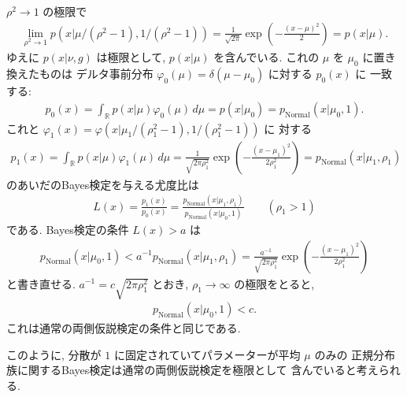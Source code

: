 \documentclass[12pt,twoside]{jarticle}
\newcommand\R{{\mathbb R}} %
\theoremstyle{jplain}
\theoremstyle{jplain}
\theoremstyle{jplain}
\numberwithin{theorem}{section}
\numberwithin{equation}{section}
\numberwithin{figure}{section}
\numberwithin{table}{section}
\begin{document}
$\rho^2\to 1$ の極限で
\begin{align*}
  \lim_{\rho^2\to1}
  p(x|\mu/(\rho^2-1),1/(\rho^2-1))
  =\frac{1}{\sqrt{2\pi}}\exp\left(-\frac{(x-\mu)^2}{2}\right)
  =p(x|\mu).
\end{align*}
ゆえに $p(x|\nu,g)$ は極限として, $p(x|\mu)$ を含んでいる.
これの $\mu$ を $\mu_0$ に置き換えたものは
デルタ事前分布 $\varphi_0(\mu)=\delta(\mu-\mu_0)$ に対する $p_0(x)$ に
一致する:
\begin{align*}
  p_0(x) = \int_\R p(x|\mu)\varphi_0(\mu)\,d\mu = p(x|\mu_0)
  =p_{\mathrm{Normal}}(x|\mu_0,1).
\end{align*}
これと $\varphi_1(x)=\varphi(x|\mu_1/(\rho_1^2-1),1/(\rho_1^2-1))$ に
対する
\begin{align*}
  p_1(x) = \int_\R p(x|\mu)\varphi_1(\mu)\,d\mu
  = \frac{1}{\sqrt{2\pi\rho_1^2}}
  \exp\left(-\frac{(x-\mu_1)^2}{2\rho_1^2}\right)
  =p_{\mathrm{Normal}}(x|\mu_1,\rho_1)
\end{align*}
のあいだのBayes検定を与える尤度比は
\begin{align*}
  L(x)
  =\frac{p_1(x)}{p_0(x)}
  =\frac
  {p_{\mathrm{Normal}}(x|\mu_1,\rho_1)}
  {p_{\mathrm{Normal}}(x|\mu_0,1)}
  \qquad (\rho_1>1)
\end{align*}
である. Bayes検定の条件 $L(x)>a$ は
\begin{align*}
  p_{\mathrm{Normal}}(x|\mu_0,1)
  < a^{-1} p_{\mathrm{Normal}}(x|\mu_1,\rho_1)
  = \frac{a^{-1}}{\sqrt{2\pi\rho_1^2}}
  \exp\left(-\frac{(x-\mu_1)^2}{2\rho_1^2}\right)
\end{align*}
と書き直せる.  $a^{-1} = c\sqrt{2\pi\rho_1^2}$ とおき,
$\rho_1\to\infty$ の極限をとると,
\begin{align*}
  p_{\mathrm{Normal}}(x|\mu_0,1) < c.
\end{align*}
これは通常の両側仮説検定の条件と同じである.

このように, 分散が $1$ に固定されていてパラメーターが平均 $\mu$ のみの
正規分布族に関するBayes検定は通常の両側仮説検定を極限として
含んでいると考えられる.

\end{document}
